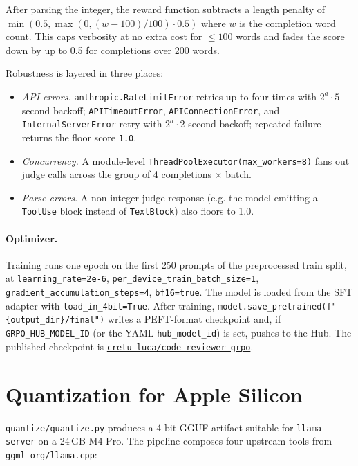 \documentclass[11pt,a4paper]{article}
\newcommand{\code}[1]{\texttt{\small #1}}
\begin{document}
After parsing the integer, the reward function subtracts a length penalty
of $\min(0.5, \max(0, (w-100)/100) \cdot 0.5)$ where $w$ is the completion
word count. This caps verbosity at no extra cost for $\le 100$ words and
fades the score down by up to 0.5 for completions over 200 words.

Robustness is layered in three places:

\begin{itemize}[leftmargin=*]
  \item \emph{API errors.} \code{anthropic.RateLimitError} retries up to
        four times with $2^a \cdot 5$ second backoff;
        \code{APITimeoutError}, \code{APIConnectionError}, and
        \code{InternalServerError} retry with $2^a \cdot 2$ second backoff;
        repeated failure returns the floor score \code{1.0}.
  \item \emph{Concurrency.} A module-level
        \code{ThreadPoolExecutor(max\_workers=8)} fans out judge calls
        across the group of 4 completions $\times$ batch.
  \item \emph{Parse errors.} A non-integer judge response (e.g. the model
        emitting a \code{ToolUse} block instead of \code{TextBlock}) also
        floors to 1.0.
\end{itemize}

\paragraph{Optimizer.} Training runs one epoch on the first 250 prompts of
the preprocessed train split, at \code{learning\_rate=2e-6},
\code{per\_device\_train\_batch\_size=1},
\code{gradient\_accumulation\_steps=4}, \code{bf16=true}. The model is
loaded from the SFT adapter with \code{load\_in\_4bit=True}. After
training, \code{model.save\_pretrained(f"\{output\_dir\}/final")} writes a
PEFT-format checkpoint and, if \code{GRPO\_HUB\_MODEL\_ID} (or the YAML
\code{hub\_model\_id}) is set, pushes to the Hub. The published checkpoint
is \href{https://huggingface.co/cretu-luca/code-reviewer-grpo}%
{\code{cretu-luca/code-reviewer-grpo}}.

\section{Quantization for Apple Silicon}

\code{quantize/quantize.py} produces a 4-bit GGUF artifact suitable for
\code{llama-server} on a 24\,GB M4 Pro. The pipeline composes four
upstream tools from \code{ggml-org/llama.cpp}:
\end{document}
